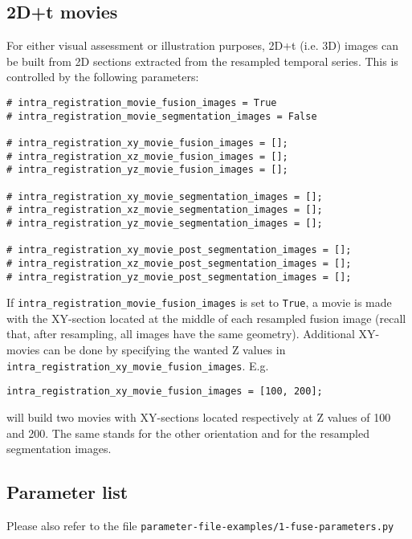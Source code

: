 \subsection{2D+t movies}
\label{sec:cli:intraregistration:movies}
For either visual assessment or illustration purposes, 2D+t (i.e. 3D) images can be built from 2D sections extracted from the resampled temporal series. This is controlled by the following parameters:
\begin{verbatim}
# intra_registration_movie_fusion_images = True
# intra_registration_movie_segmentation_images = False

# intra_registration_xy_movie_fusion_images = [];
# intra_registration_xz_movie_fusion_images = [];
# intra_registration_yz_movie_fusion_images = [];

# intra_registration_xy_movie_segmentation_images = [];
# intra_registration_xz_movie_segmentation_images = [];
# intra_registration_yz_movie_segmentation_images = [];

# intra_registration_xy_movie_post_segmentation_images = [];
# intra_registration_xz_movie_post_segmentation_images = [];
# intra_registration_yz_movie_post_segmentation_images = [];
\end{verbatim}

If \verb|intra_registration_movie_fusion_images| is set to \verb|True|, a movie is made with the  XY-section located at the middle of each resampled fusion image (recall that, after resampling, all images have the same geometry). Additional XY-movies can be done by specifying the wanted Z values in \verb|intra_registration_xy_movie_fusion_images|. E.g.
\begin{verbatim}
intra_registration_xy_movie_fusion_images = [100, 200];
\end{verbatim}
will build two movies with XY-sections located respectively at Z values of 100 and 200. The same stands for the other orientation and for the resampled segmentation images.

\subsection{Parameter list}

Please also refer to the file
\texttt{parameter-file-examples/1-fuse-parameters.py}

